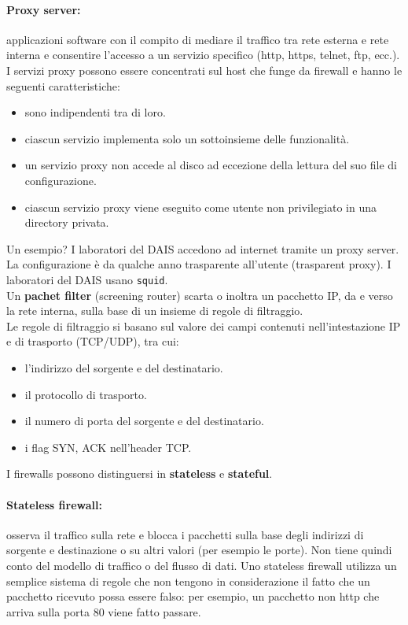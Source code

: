 \documentclass[a4paper]{report}
\begin{document}
\paragraph{Proxy server:} applicazioni software con il compito di mediare il traffico tra rete
esterna e rete interna e consentire l'accesso a un servizio specifico (http, https,
telnet, ftp, ecc.).\\
I servizi proxy possono essere concentrati sul host che funge da firewall e
hanno le seguenti caratteristiche:
\begin{itemize}
\item sono indipendenti tra di loro.
\item ciascun servizio implementa solo un sottoinsieme delle funzionalità.
\item un servizio proxy non accede al disco ad eccezione della lettura del suo file di
configurazione.
\item ciascun servizio proxy viene eseguito come utente non privilegiato in una directory
privata.
\end{itemize}
Un esempio? I laboratori del DAIS accedono ad internet tramite un proxy server. La configurazione è da qualche anno trasparente all'utente (trasparent proxy). I laboratori del DAIS usano \texttt{squid}.\\
Un \textbf{pachet filter} (screening router) scarta o inoltra un pacchetto IP, da e verso la rete interna, sulla base di un insieme di regole di filtraggio.\\
Le regole di filtraggio si basano sul valore dei campi contenuti nell'intestazione IP e di trasporto (TCP/UDP), tra cui:
\begin{itemize}
\item l'indirizzo del sorgente e del destinatario.
\item il protocollo di trasporto.
\item il numero di porta del sorgente e del destinatario.
\item i flag SYN, ACK nell'header TCP.
\end{itemize}
I firewalls possono distinguersi in \textbf{stateless} e \textbf{stateful}.\\
\paragraph{Stateless firewall:} osserva il traffico sulla rete e blocca i pacchetti sulla base degli indirizzi di sorgente e destinazione o su altri valori (per esempio le porte). Non tiene quindi conto del modello di traffico o del flusso di dati. Uno stateless firewall utilizza un semplice sistema di regole che non tengono in considerazione il fatto che un pacchetto ricevuto possa essere falso: per esempio, un pacchetto non http che arriva sulla porta 80 viene fatto passare.\\
\end{document}
